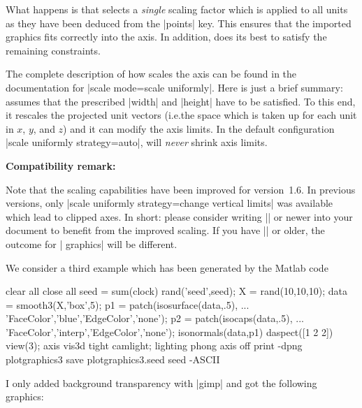 {{\begin{codeexample}[]
\end{codeexample}
%
\noindent What happens is that \PGFPlots{} selects a \emph{single} scaling
factor which is applied to all units as they have been deduced from the
|points| key. This ensures that the imported graphics fits correctly into the
axis. In addition, \PGFPlots{} does its best to satisfy the remaining
constraints.

The complete description of how \PGFPlots{} scales the axis can be found in the
documentation for |scale mode=scale uniformly|. Here is just a brief summary:
\PGFPlots{} assumes that the prescribed |width| and |height| have to be
satisfied. To this end, it rescales the projected unit vectors (i.e.\@ the
space which is taken up for each unit in $x$, $y$, and $z$) and it can modify
the axis limits. In the default configuration |scale uniformly strategy=auto|,
\PGFPlots{} will \emph{never} shrink axis limits.


\textbf{Compatibility remark:}

Note that the scaling capabilities have been improved for \PGFPlots{}
version~1.6. In previous versions, only
|scale uniformly strategy=change vertical limits| was available which lead to
clipped axes. In short: please consider writing |\pgfplotsset{compat=1.6}| or
newer into your document to benefit from the improved scaling. If you have
|\pgfplotsset{compat=1.5}| or older, the outcome for | graphics| will
be different.

We consider a third example which has been generated by the Matlab code
%
\begin{codeexample}
clear all
close all
seed = sum(clock)
rand('seed',seed);
X = rand(10,10,10);
data = smooth3(X,'box',5);
p1 = patch(isosurface(data,.5), ...
   'FaceColor','blue','EdgeColor','none');
p2 = patch(isocaps(data,.5), ...
    'FaceColor','interp','EdgeColor','none');
isonormals(data,p1)
daspect([1 2 2])
view(3); axis vis3d tight
camlight; lighting phong
axis off
print -dpng plotgraphics3
save  plotgraphics3.seed seed -ASCII %
\end{codeexample}
%
\noindent I only added background transparency with |gimp| and got the following
graphics:

}}

